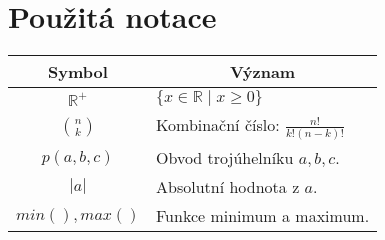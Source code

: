 \chapter*{Použitá notace}
\label{sec:notace}
\noindent
\begin{table}[h]
    \centering
\begin{tabular}{c l}
    Symbol & \multicolumn{1}{c}{Význam} \\
    \toprule
    $\mathbb{R}^+$ & $\{ x \in \mathbb{R} \mid x \geq 0 \}$ \\
    $ \binom{n}{k}$ & Kombinační číslo: $\frac{n!}{k!(n-k)!}$ \\
    $ p(a, b, c)$ & Obvod trojúhelníku $a, b, c$. \\
    $ |a| $ & Absolutní hodnota z $a$. \\
    $min(), max()$ & Funkce minimum a maximum. \\
    
\end{tabular}
\end{table}